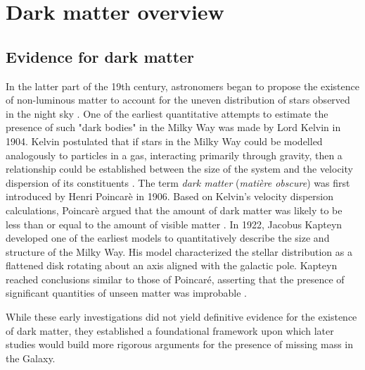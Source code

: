 \chapter{Dark matter overview}\label{chap:DarkMatterOverview}
\section{Evidence for dark matter}\label{sec:DMOverview/Evidence4DM}
In the latter part of the 19th century, astronomers began to propose the existence of non-luminous matter to account for the uneven distribution of stars observed in the night sky \cite{HistoryofDM}. One of the earliest quantitative attempts to estimate the presence of such "dark bodies" in the Milky Way was made by Lord Kelvin in 1904. Kelvin postulated that if stars in the Milky Way could be modelled analogously to particles in a gas, interacting primarily through gravity, then a relationship could be established between the size of the system and the velocity dispersion of its constituents \cite{Kelvin1904}. The term \textit{dark matter} (\textit{mati\`ere obscure}) was first introduced by Henri Poincar\`e in 1906. Based on Kelvin’s velocity dispersion calculations, Poincar\`e argued that the amount of dark matter was likely to be less than or equal to the amount of visible matter \cite{HPon}. In 1922, Jacobus Kapteyn developed one of the earliest models to quantitatively describe the size and structure of the Milky Way. His model characterized the stellar distribution as a flattened disk rotating about an axis aligned with the galactic pole. Kapteyn reached conclusions similar to those of Poincaré, asserting that the presence of significant quantities of unseen matter was improbable \cite{Kapteyn1922}.

While these early investigations did not yield definitive evidence for the existence of dark matter, they established a foundational framework upon which later studies would build more rigorous arguments for the presence of missing mass in the Galaxy.

